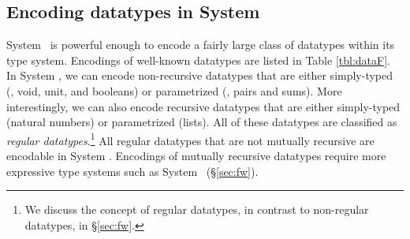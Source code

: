 \subsection{Encoding datatypes in System \F}
\label{sec:f:data}
System \F\ is  powerful enough to encode a fairly large class of datatypes
within its type system. Encodings of well-known datatypes are listed in
Table \ref{tbl:dataF}. In System \F, we can encode non-recursive datatypes
that are either simply-typed (\eg, void, unit, and booleans)
or parametrized (\eg, pairs and sums).
More interestingly, we can also encode recursive datatypes
that are either simply-typed (natural numbers) or parametrized (lists).
All of these datatypes are classified as \emph{regular datatypes}.\footnote{
	We discuss the concept of regular datatypes,
	in contrast to non-regular datatypes, in \S\ref{sec:fw}. }
All regular datatypes that are not mutually recursive are encodable
in System \F. Encodings of mutually recursive datatypes require
more expressive type systems such as System \Fw\ (\S\ref{sec:fw}).

